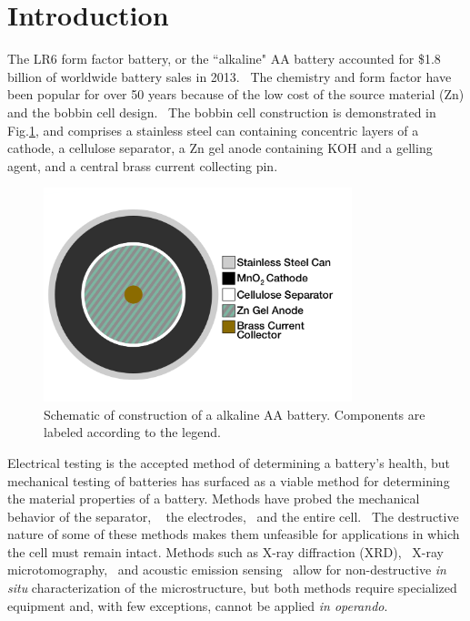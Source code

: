 \section{Introduction}
\label{sec:dbb:intro}

The LR6 form factor {} battery, or the ``alkaline" AA battery accounted for \$1.8 billion of worldwide battery sales in 2013.~\cite{highbeam,ibisworld}  The chemistry and form factor have been popular for over 50 years because of the low cost of the source material (Zn) and the  bobbin cell design.~\cite{karl_patent} The bobbin cell construction is demonstrated in Fig.\ref{fig:aaschem}, and comprises a stainless steel can containing concentric layers of a  cathode, a cellulose separator, a Zn gel anode containing KOH and a gelling agent, and a central brass current collecting pin.

\begin{figure}[htb]
  \centering
    \includegraphics[width=0.80\textwidth]{ch3-dbb/Images/aaschem.png}
    \caption[Schematic of construction of a alkaline AA battery.]{Schematic of construction of a alkaline AA battery. Components are labeled according to the legend.}
    \label{fig:aaschem}
\end{figure}

Electrical testing is the accepted method of determining a battery's health, but mechanical testing of batteries has surfaced as a viable method for determining the material properties of a battery. Methods have probed the mechanical behavior of the separator, ~\cite{cannarella_ion,peabody_separator} the electrodes,~\cite{chen,du_cycling,han,park,striebel} and the entire cell.~\cite{cannarella_stress} The destructive nature of some of these methods makes them unfeasible for applications in which the cell must remain intact. Methods such as X-ray diffraction (XRD),~\cite{gallaway} X-ray microtomography,~\cite{haibel,Manke2007-yj,ebner} and acoustic emission sensing~\cite{etiemble,kalnaus,kircheva,rhodes} allow for non-destructive \textit{in situ} characterization of the microstructure, but both methods require specialized equipment and, with few exceptions, cannot be applied \textit{in operando}.

